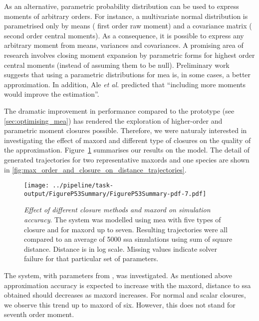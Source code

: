 As an alternative, parametric probability distribution can be used to express moments of arbitrary orders.
For instance, a multivariate normal distribution is parametrised only by means (\ie{} first order raw moment)
and a covariance matrix (\ie{} second order central moments).
As a consequence, it is possible to express any arbitrary moment from means, variances and covariances.
A promising area of research involves closing moment expansion by parametric forms for highest order central moments (instead of assuming them to be null).
Preliminary work \cite{lakatos_preparation_2014} suggests that using a parametric distributions for \gls{mea} is, in some cases, a better approximation.
In addition, Ale \emph{et al.} predicted that ``including more moments would improve the estimation''\cite{ale_general_2013}.

The dramatic improvement in performance compared to the \mat{} prototype (see \autoref{sec:optimising_mea}) has rendered the exploration of higher-order and parametric moment closures possible.
Therefore, we were naturaly interested in investigating the effect of \gls{maxord} and different type of closures on the quality of the approximation.
Figure~\ref{fig:max_order_and_closure_on_distance_summary} summarises our results on the \pft{} model. 
The detail of generated trajectories for two representative \gls{maxord}s and one species are shown in
\autoref{fig:max_order_and_closure_on_distance_trajectories}.

\begin{figure}[t]
    \centering
    \texttt{[image: ../pipeline/task-output/FigureP53Summary/FigureP53Summary-pdf-7.pdf]}
    \caption{\emph{Effect of different closure methods and \gls{maxord} on simulation accuracy}. The \pft{} system was modelled using \gls{mea} with five types of closure and for \gls{maxord} up to seven.
Resulting trajectories were all compared to an average of 5000 \gls{ssa} simulations using sum of square distance.
Distance is in log scale. Missing values indicate solver failure for that particular set of parameters.}
    \label{fig:max_order_and_closure_on_distance_summary}
\end{figure}

The \pft{} system, with parameters from \cite{ale_general_2013}, was investigated.
As mentioned above approximation accuracy is expected to increase with the \gls{maxord}, \ie{} distance to \gls{ssa} obtained should decreases
 as \gls{maxord} increases.
For normal and scalar closures, we observe this trend up to \gls{maxord} of six.
However, this does not stand for seventh order moment.

